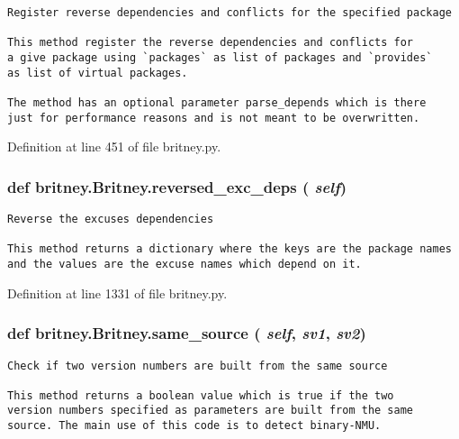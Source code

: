 \footnotesize\begin{verbatim}Register reverse dependencies and conflicts for the specified package

This method register the reverse dependencies and conflicts for
a give package using `packages` as list of packages and `provides`
as list of virtual packages.

The method has an optional parameter parse_depends which is there
just for performance reasons and is not meant to be overwritten.
\end{verbatim}
\normalsize
 

Definition at line 451 of file britney.py.
\subsubsection{\setlength{\rightskip}{0pt plus 5cm}def britney.Britney.reversed\_\-exc\_\-deps ( {\em self})}\label{classbritney_1_1Britney_be1b4af9d6c6650c70b24267412bc1a8}




\footnotesize\begin{verbatim}Reverse the excuses dependencies

This method returns a dictionary where the keys are the package names
and the values are the excuse names which depend on it.
\end{verbatim}
\normalsize
 

Definition at line 1331 of file britney.py.
\subsubsection{\setlength{\rightskip}{0pt plus 5cm}def britney.Britney.same\_\-source ( {\em self},  {\em sv1},  {\em sv2})}\label{classbritney_1_1Britney_85d2e45e8431779b62f398c34972ddf1}




\footnotesize\begin{verbatim}Check if two version numbers are built from the same source

This method returns a boolean value which is true if the two
version numbers specified as parameters are built from the same
source. The main use of this code is to detect binary-NMU.
\end{verbatim}
\normalsize
 

